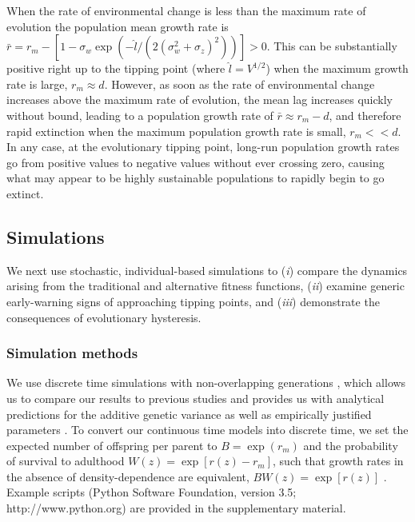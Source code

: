 \documentclass[12pt,letterpaper]{article} %
\begin{document}
When the rate of environmental change is less than the maximum rate of evolution the population mean growth rate is $\bar{r} = r_m - \left[ 1 - \sigma_w \exp\left( - \hat{l} / (2(\sigma_w^2 + \sigma_z)^2) \right)\right] > 0$. 
This can be substantially positive right up to the tipping point (where $\hat{l} = V^{1/2}$) when the maximum growth rate is large, $r_m\approx d$. %
However, as soon as the rate of environmental change increases above the maximum rate of evolution, the mean lag increases quickly without bound, leading to a population growth rate of $\bar{r} \approx r_m - d$, and therefore rapid extinction when the maximum population growth rate is small, $r_m << d$.
In any case, at the evolutionary tipping point, long-run population growth rates go from positive values to negative values without ever crossing zero, causing what may appear to be highly sustainable populations to rapidly begin to go extinct.

\subsection*{Simulations}

We next use stochastic, individual-based simulations to (\textit{i}) compare the dynamics arising from the traditional and alternative fitness functions, (\textit{ii}) examine generic early-warning signs of approaching tipping points, and (\textit{iii}) demonstrate the consequences of evolutionary hysteresis.

\subsubsection*{Simulation methods}

We use discrete time simulations with non-overlapping generations \citep[as described in][]{Burger1995}, which allows us to compare our results to previous studies and provides us with analytical predictions for the additive genetic variance \citep[equations 14 and 15 in][]{Burger1995} as well as empirically justified parameters \citep{Burger1995}.
To convert our continuous time models into discrete time, we set the expected number of offspring per parent to $B=\exp(r_m)$ and the probability of survival to adulthood $W(z)=\exp[r(z)-r_m]$, such that growth rates in the absence of density-dependence are equivalent, $BW(z)=\exp[r(z)]$ \citep[][Chapter 1]{Crow1970}.
Example scripts (Python Software Foundation, version 3.5; http://www.python.org) are provided in the supplementary material.
\end{document}

